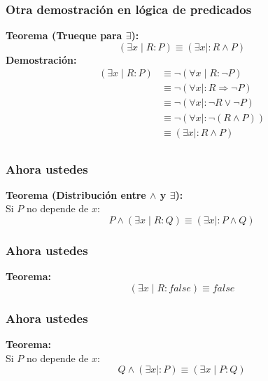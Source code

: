\documentclass{beamer}
\newcommand{\then}{\Rightarrow}
\begin{document}
\begin{frame}[fragile]
    \frametitle{Otra demostración en lógica de predicados}
    \pause
    \textbf{Teorema (Trueque para $\exists$):}
    $$(\exists x \mid R : P) \equiv (\exists x \mid : R \land P)$$
    \pause
    \textbf{Demostración:} \\
    \pause
    \begin{align*}
        (\exists x \mid R : P) &\equiv \lnot (\forall x \mid R : \lnot P) \tag{De Morgan gen.}\\ 
        &\equiv \lnot (\forall x \mid : R \then \lnot P) \tag{trueque para $\forall$}\\
        &\equiv \lnot (\forall x \mid : \lnot R \lor \lnot P) \tag{definición $\then$}\\
        &\equiv \lnot (\forall x \mid : \lnot (R \land P)) \tag{De Morgan }\\
        &\equiv (\exists x \mid : R \land P) \tag{De Morgan gen.}\\
    \end{align*}
\end{frame}

\begin{frame}[fragile]
    \frametitle{Ahora ustedes}
    \pause
    \textbf{Teorema (Distribución entre $\land$ y $\exists$):} \\
    Si $P$ no depende de $x$:
    $$P \land (\exists x \mid R : Q) \equiv (\exists x \mid : P \land Q)$$
    \vspace*{165 pt}
\end{frame}

\begin{frame}[fragile]
    \frametitle{Ahora ustedes}
    \pause
    \textbf{Teorema:} \\
    $$(\exists x \mid R : false) \equiv false$$
    \vspace*{165 pt}
\end{frame}

\begin{frame}[fragile]
    \frametitle{Ahora ustedes}
    \pause
    \textbf{Teorema:} \\
    Si $P$ no depende de $x$:
    $$Q \land (\exists x \mid : P) \equiv (\exists x \mid P : Q)$$
    \vspace*{165 pt}
\end{frame}
\end{document}

